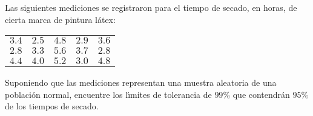 \begin{enunciado}
 Las siguientes mediciones se registraron para el tiempo de secado, en horas, de cierta marca de pintura l\'atex:
 \begin{center}
  \begin{tabular}{ccccc}
   $3.4$ & $2.5$ & $4.8$ & $2.9$ & $3.6$ \\
   $2.8$ & $3.3$ & $5.6$ & $3.7$ & $2.8$ \\
   $4.4$ & $4.0$ & $5.2$ & $3.0$ & $4.8$
  \end{tabular}
 \end{center}
 Suponiendo que las mediciones representan una muestra aleatoria de una poblaci\'on normal, encuentre los l\'{\i}mites de tolerancia de $99\%$ que contendr\'an $95\%$ de los tiempos de secado.
\end{enunciado}

